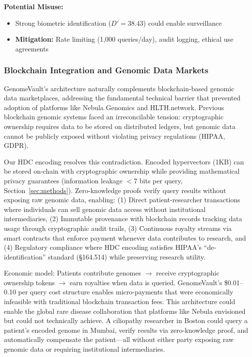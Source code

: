 \documentclass[11pt,letterpaper]{article}
\begin{document}
\textbf{Potential Misuse:}
\begin{itemize}
\item Strong biometric identification ($D'=38.43$) could enable surveillance
\item \textbf{Mitigation:} Rate limiting (1,000 queries/day), audit logging, ethical use agreements
\end{itemize}

\subsubsection{Blockchain Integration and Genomic Data Markets}

GenomeVault's architecture naturally complements blockchain-based genomic data marketplaces, addressing the fundamental technical barrier that prevented adoption of platforms like Nebula Genomics and HLTH.network. Previous blockchain genomic systems faced an irreconcilable tension: cryptographic ownership requires data to be stored on distributed ledgers, but genomic data cannot be publicly exposed without violating privacy regulations (HIPAA, GDPR).

Our HDC encoding resolves this contradiction. Encoded hypervectors (1KB) can be stored on-chain with cryptographic ownership while providing mathematical privacy guarantees (information leakage $<$7 bits per query, Section~\ref{sec:methods}). Zero-knowledge proofs verify query results without exposing raw genomic data, enabling: (1) Direct patient-researcher transactions where individuals can sell genomic data access without institutional intermediaries, (2) Immutable provenance with blockchain records tracking data usage through cryptographic audit trails, (3) Continuous royalty streams via smart contracts that enforce payment whenever data contributes to research, and (4) Regulatory compliance where HDC encoding satisfies HIPAA's ``de-identification'' standard (\S164.514) while preserving research utility.

Economic model: Patients contribute genomes $\rightarrow$ receive cryptographic ownership tokens $\rightarrow$ earn royalties when data is queried. GenomeVault's \$0.01--0.10 per query cost structure enables micro-payments that were economically infeasible with traditional blockchain transaction fees. This architecture could enable the global rare disease collaboration that platforms like Nebula envisioned but could not technically achieve. A ciliopathy researcher in Boston could query a patient's encoded genome in Mumbai, verify results via zero-knowledge proof, and automatically compensate the patient---all without either party exposing raw genomic data or requiring institutional intermediaries.
\end{document}
